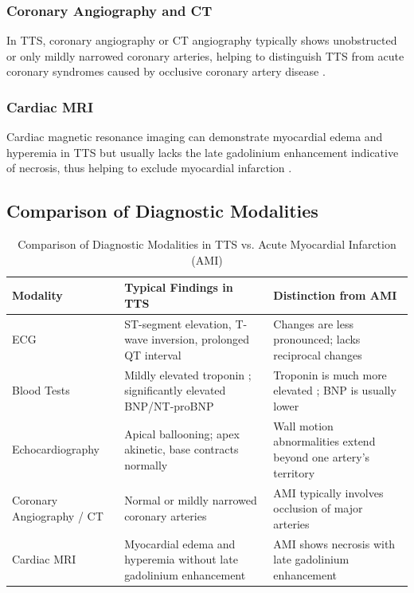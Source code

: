 \documentclass[12pt, BSc]{muthesis}
\begin{document}
\subsubsection{Coronary Angiography and CT}
In TTS, coronary angiography or CT angiography typically shows unobstructed or only mildly narrowed coronary arteries, helping to distinguish TTS from acute coronary syndromes caused by occlusive coronary artery disease \cite{Pelliccia2017}.

\subsubsection{Cardiac MRI}
Cardiac magnetic resonance imaging can demonstrate myocardial edema and hyperemia in TTS but usually lacks the late gadolinium enhancement indicative of necrosis, thus helping to exclude myocardial infarction \cite{Kohan2014}.

\subsection{Comparison of Diagnostic Modalities}
\begin{table}[H]
    \centering
    \caption{Comparison of Diagnostic Modalities in TTS vs. Acute Myocardial Infarction (AMI)}
    \label{tab:diagnostic-tts}
    \begin{tabular}{|p{4cm}|p{5.5cm}|p{5.5cm}|}
    \hline
    \textbf{Modality} & \textbf{Typical Findings in TTS} & \textbf{Distinction from AMI} \\ \hline
    
    ECG & ST-segment elevation, T-wave inversion, prolonged QT interval \cite{Gianni2006} & Changes are less pronounced; lacks reciprocal changes \cite{PRASAD2008408} \\ \hline
    
    Blood Tests & Mildly elevated troponin \cite{Gianni2006}; significantly elevated BNP/NT-proBNP \cite{GUPTA2018165} & Troponin is much more elevated \cite{Gianni2006}; BNP is usually lower \cite{GUPTA2018165} \\ \hline
    
    Echocardiography & Apical ballooning; apex akinetic, base contracts normally \cite{DiazNavarro2021} & Wall motion abnormalities extend beyond one artery's territory \cite{PRASAD2008408} \\ \hline
    
    Coronary Angiography / CT & Normal or mildly narrowed coronary arteries \cite{Pelliccia2017} & AMI typically involves occlusion of major arteries \cite{PRASAD2008408} \\ \hline
    
    Cardiac MRI & Myocardial edema and hyperemia without late gadolinium enhancement \cite{Kohan2014} & AMI shows necrosis with late gadolinium enhancement \cite{Kohan2014} \\ \hline
    
    \end{tabular}
\end{table}
\end{document}
